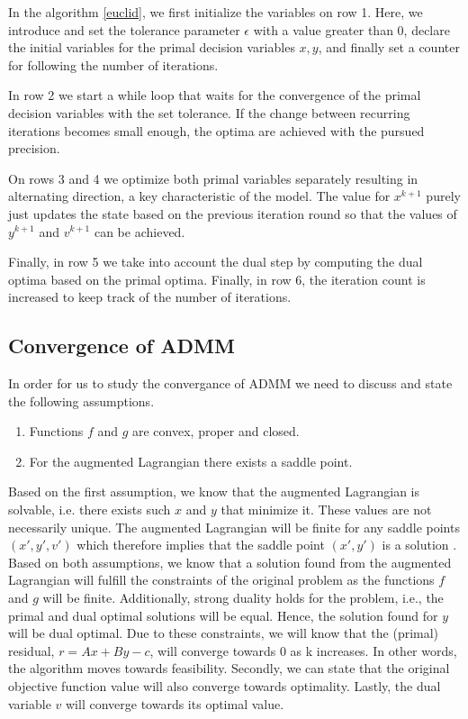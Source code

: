 \documentclass[a4paper]{artikel3}
\begin{document}
In the algorithm \ref{euclid}, we first initialize the variables on row 1. Here, we introduce and set the tolerance parameter $\epsilon$ with a value greater than 0, declare the initial variables for the primal decision variables $x,y$, and finally set a counter for following the number of iterations.

In row 2 we start a while loop that waits for the convergence of the primal decision variables with the set tolerance. If the change between recurring iterations becomes small enough, the optima are achieved with the pursued precision.

On rows 3 and 4 we optimize both primal variables separately resulting in alternating direction, a key characteristic of the model. The value for $x^{k+1}$ purely just updates the state based on the previous iteration round so that the values of $y^{k+1}$ and $v^{k+1}$ can be achieved.

Finally, in row 5 we take into account the dual step by computing the dual optima based on the primal optima. Finally, in row 6, the iteration count is increased to keep track of the number of iterations.

\subsection{Convergence of ADMM}
In order for us to study the convergance of ADMM we need to discuss and state the following assumptions.%
\begin{enumerate}
    \item Functions $f$ and $g$ are convex, proper and closed. \cite{boyd2011distributed}
    \item For the augmented Lagrangian there exists a saddle point. \cite{boyd2011distributed}
\end{enumerate}
Based on the first assumption, we know that the augmented Lagrangian is solvable, i.e. there exists such $x$ and $y$ that minimize it. These values are not necessarily unique. The augmented Lagrangian will be finite for any saddle points $(x',y',v')$ which therefore implies that the saddle point $(x',y')$ is a solution \cite{boyd2011distributed}. Based on both assumptions, we know that a solution found from the augmented Lagrangian will fulfill the constraints of the original problem as the functions $f$ and $g$ will be finite. Additionally, strong duality holds for the problem, i.e., the primal and dual optimal solutions will be equal. Hence, the solution found for $y$ will be dual optimal. Due to these constraints, we will know that the (primal) residual, $r = Ax + By - c$, will converge towards 0 as k increases. In other words, the algorithm moves towards feasibility. Secondly, we can state that the original objective function value will also converge towards optimality. Lastly, the dual variable $v$ will converge towards its optimal value. 
\end{document}
